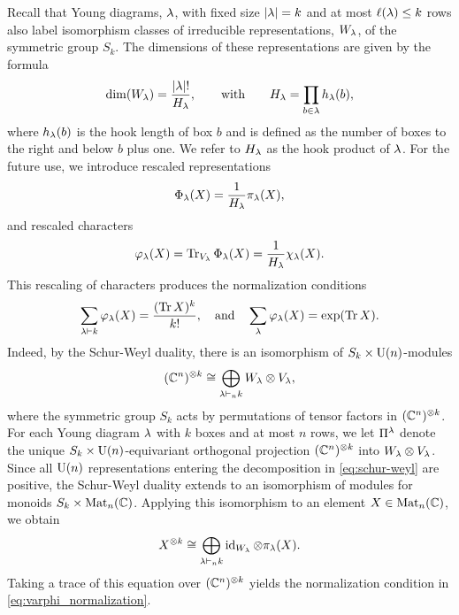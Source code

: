 \documentclass[notitlepage, 11pt, letterpaper]{amsart}
\begin{document}
Recall that Young diagrams, $\lambda$, with fixed size $|\lambda|=k$ and at most $\ell(\lambda) \leq k$ rows also label isomorphism classes of irreducible representations, $W_\lambda$, of the symmetric group $S_k$.
The dimensions of these representations are given by the formula
\begin{equation}
    \label{eq:dim_W_hook_product}
    \dim(W_\lambda) = \frac{|\lambda|!}{H_{\lambda}},
    \qquad
    \text{with}
    \qquad
    H_{\lambda} = \prod_{b \in \lambda} h_\lambda(b),
\end{equation}
where $h_\lambda(b)$ is the hook length of box $b$ and is defined as the number of boxes to the right and below $b$ plus one.
We refer to $H_{\lambda}$ as the hook product of $\lambda$.
For the future use, we introduce rescaled representations
\begin{equation}
    \Phi_\lambda(X) = \frac{1}{H_{\lambda}} \pi_\lambda(X),
\end{equation}
and rescaled characters
\begin{equation}
    \varphi_\lambda(X) = \operatorname{Tr}_{V_\lambda}  \Phi_\lambda(X) = \frac{1}{H_{\lambda}}  \chi_\lambda(X).
\end{equation}
This rescaling of characters produces the normalization conditions
\begin{equation}
    \label{eq:varphi_normalization}
    \sum_{\lambda \vdash k} \varphi_\lambda(X) = \frac{(\operatorname{Tr} X)^k}{k!},
    \quad \text{and} \quad
    \sum_\lambda \varphi_\lambda(X) = \exp(\operatorname{Tr} X).
\end{equation}
Indeed, by the Schur-Weyl duality, there is an isomorphism of $S_k \times \operatorname{U}(n)$-modules
\begin{equation}
    \label{eq:schur-weyl}
    (\mathbb{C}^n)^{\otimes k} \cong \bigoplus_{\lambda \vdash_{n} k} W_\lambda \otimes V_\lambda,
\end{equation}
where the symmetric group $S_k$ acts by permutations of tensor factors in $(\mathbb{C}^n)^{\otimes k}$.
For each Young diagram $\lambda$ with $k$ boxes and at most $n$ rows, we let $\Pi^{\lambda}$
denote the unique $S_k \times \operatorname{U}(n)$-equivariant orthogonal projection $(\mathbb{C}^n)^{\otimes k}$ into $W_{\lambda} \otimes V_{\lambda}$.
Since all $\operatorname{U}(n)$ representations entering the decomposition in \cref{eq:schur-weyl} are positive, the Schur-Weyl duality extends to an isomorphism of modules for monoids $S_k \times \operatorname{Mat}_n(\mathbb{C})$.
Applying this isomorphism to an element $X \in \operatorname{Mat}_n(\mathbb{C})$, we obtain
\begin{equation}
    \label{eq:X^k}
    X^{\otimes k} \cong \bigoplus_{\lambda \vdash_{n} k} \operatorname{id}_{W_\lambda} \otimes \pi_\lambda(X).
\end{equation}
Taking a trace of this equation over $(\mathbb{C}^n)^{\otimes k}$ yields the normalization condition in \cref{eq:varphi_normalization}.
\end{document}
